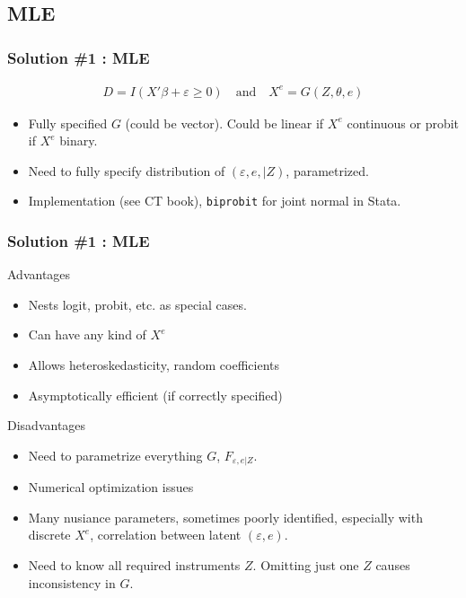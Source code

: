 \documentclass[11pt,dvipsnames,table,aspectratio=169]{beamer}
\begin{document}
\subsection{MLE}

\begin{frame}
\frametitle{Solution \#1 : MLE}
\begin{eqnarray*}
D = I ( X' \beta + \varepsilon \geq 0 ) \quad \mbox{and} \quad X^e = G(Z,\theta,e)
\end{eqnarray*}
\begin{itemize}
\item Fully specified $G$ (could be vector). Could be linear if $X^e$ continuous or probit if $X^e$ binary.
\item Need to fully specify distribution of $(\varepsilon,e, | Z)$, parametrized.
\item Implementation (see CT book), \texttt{biprobit} for joint normal in Stata.
\end{itemize}
\end{frame}


\begin{frame}
\frametitle{Solution \#1 : MLE}
\vspace{-10pt}
\begin{block}{Advantages}
\begin{itemize}
\item Nests logit, probit, etc. as special cases.
\item Can have any kind of $X^e$
\item Allows heteroskedasticity, random coefficients
\item Asymptotically efficient (if correctly specified)
\end{itemize}
\end{block}

\begin{block}{Disadvantages}
\begin{itemize}
\item Need to parametrize everything $G$, $F_{\varepsilon,e|Z}$.
\item Numerical optimization issues
\item Many nusiance parameters, sometimes poorly identified, especially with discrete $X^e$, correlation between latent $(\varepsilon,e)$.
\item Need to know all required instruments $Z$. Omitting just one $Z$ causes inconsistency in $G$. %
\end{itemize}
\end{block}
\end{frame}
\end{document}
